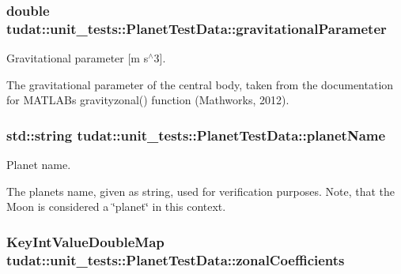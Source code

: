 \subsubsection[{\texorpdfstring{gravitational\+Parameter}{gravitationalParameter}}]{\setlength{\rightskip}{0pt plus 5cm}double tudat\+::unit\+\_\+tests\+::\+Planet\+Test\+Data\+::gravitational\+Parameter}\hypertarget{structtudat_1_1unit__tests_1_1PlanetTestData_a11fb9d4b33ce68a46380392cc81839ad}{}\label{structtudat_1_1unit__tests_1_1PlanetTestData_a11fb9d4b33ce68a46380392cc81839ad}


Gravitational parameter \mbox{[}m s$^\wedge$3\mbox{]}. 

The gravitational parameter of the central body, taken from the documentation for M\+A\+T\+L\+AB\textquotesingle{}s gravityzonal() function (Mathworks, 2012). 
\subsubsection[{\texorpdfstring{planet\+Name}{planetName}}]{\setlength{\rightskip}{0pt plus 5cm}std\+::string tudat\+::unit\+\_\+tests\+::\+Planet\+Test\+Data\+::planet\+Name}\hypertarget{structtudat_1_1unit__tests_1_1PlanetTestData_a965d857e9cf3fece2fd54f555fb29c47}{}\label{structtudat_1_1unit__tests_1_1PlanetTestData_a965d857e9cf3fece2fd54f555fb29c47}


Planet name. 

The planet\textquotesingle{}s name, given as string, used for verification purposes. Note, that the Moon is considered a \char`\"{}planet\char`\"{} in this context. 
\subsubsection[{\texorpdfstring{zonal\+Coefficients}{zonalCoefficients}}]{\setlength{\rightskip}{0pt plus 5cm}Key\+Int\+Value\+Double\+Map tudat\+::unit\+\_\+tests\+::\+Planet\+Test\+Data\+::zonal\+Coefficients}\hypertarget{structtudat_1_1unit__tests_1_1PlanetTestData_aefcb3b33844b59812d284e741c6602ab}{}\label{structtudat_1_1unit__tests_1_1PlanetTestData_aefcb3b33844b59812d284e741c6602ab}


